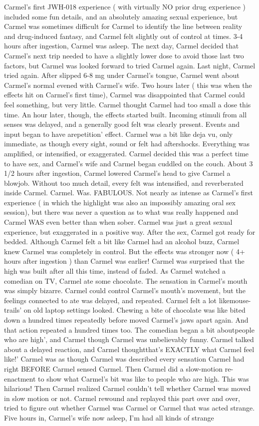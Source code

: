 \documentclass[12pt]{book}
\begin{document}
Carmel's first JWH-018 experience ( with virtually NO prior drug experience ) included some fun details, and an absolutely amazing sexual experience, but Carmel was sometimes difficult for Carmel to identify the line between reality and drug-induced fantasy, and Carmel felt slightly out of control at times. 3-4 hours after ingestion, Carmel was asleep. The next day, Carmel decided that Carmel's next trip needed to have a slightly lower dose to avoid those last two factors, but Carmel was looked forward to tried Carmel again. Last night, Carmel tried again. After slipped 6-8 mg under Carmel's tongue, Carmel went about Carmel's normal evened with Carmel's wife. Two hours later ( this was when the effects hit on Carmel's first time), Carmel was disappointed that Carmel could feel something, but very little. Carmel thought Carmel had too small a dose this time. An hour later, though, the effects started built. Incoming stimuli from all senses was delayed, and a generally good felt was clearly present. Events and input began to have arepetition' effect. Carmel was a bit like deja vu, only immediate, as though every sight, sound or felt had aftershocks. Everything was amplified, or intensified, or exaggerated. Carmel decided this was a perfect time to have sex, and Carmel's wife and Carmel began cuddled on the couch. About 3 1/2 hours after ingestion, Carmel lowered Carmel's head to give Carmel a blowjob. Without too much detail, every felt was intensified, and reverberated inside Carmel. Carmel. Was. FABULOUS. Not nearly as intense as Carmel's first experience ( in which the highlight was also an impossibly amazing oral sex session), but there was never a question as to what was really happened and Carmel WAS even better than when sober. Carmel was just a great sexual experience, but exaggerated in a positive way. After the sex, Carmel got ready for bedded. Although Carmel felt a bit like Carmel had an alcohol buzz, Carmel knew Carmel was completely in control. But the effects was stronger now ( 4+ hours after ingestion ) than Carmel was earlier! Carmel was surprised that the high was built after all this time, instead of faded. As Carmel watched a comedian on TV, Carmel ate some chocolate. The sensation in Carmel's mouth was simply bizarre. Carmel could control Carmel's mouth's movement, but the feelings connected to ate was delayed, and repeated. Carmel felt a lot likemouse-trails' on old laptop settings looked. Chewing a bite of chocolate was like bited down a hundred times repeatedly before moved Carmel's jaws apart again. And that action repeated a hundred times too. The comedian began a bit aboutpeople who are high', and Carmel though Carmel was unbelievably funny. Carmel talked about a delayed reaction, and Carmel thoughtthat's EXACTLY what Carmel feel like!' Carmel was as though Carmel was described every sensation Carmel had right BEFORE Carmel sensed Carmel. Then Carmel did a slow-motion re-enactment to show what Carmel's bit was like to people who are high. This was hilarious! Then Carmel realized Carmel couldn't tell whether Carmel was moved in slow motion or not. Carmel rewound and replayed this part over and over, tried to figure out whether Carmel was Carmel or Carmel that was acted strange. Five hours in, Carmel's wife now asleep, I'm had all kinds of strange 
\end{document}
